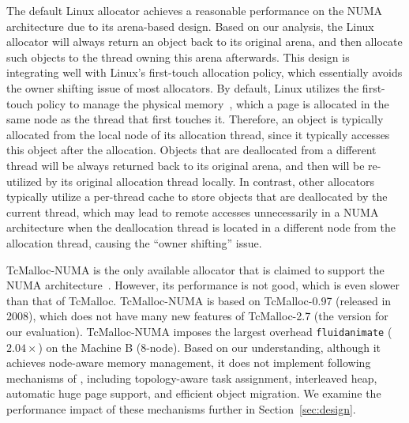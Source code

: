 The default Linux allocator achieves a reasonable performance on the NUMA architecture due to its arena-based design. Based on our analysis, the Linux allocator will always return an object back to its original arena, and then allocate such objects to the thread owning this arena afterwards. This design is integrating well with Linux's first-touch allocation policy, which essentially avoids the owner shifting issue of most allocators. By default, Linux utilizes the first-touch policy to manage the physical memory~\cite{Lameter:2013:NO:2508834.2513149}, which a page is allocated in the same node as the thread that first touches it. Therefore, an object is typically allocated from the local node of its allocation thread, since it typically accesses this object after the allocation. Objects that are deallocated from a different thread will be always returned back to its original arena, and then will be re-utilized by its original allocation thread locally. In contrast, other allocators typically utilize a per-thread cache to store objects that are deallocated by the current thread, which may lead to remote accesses unnecessarily in a NUMA architecture when the deallocation thread is located in a different node from the allocation thread, causing the ``owner shifting'' issue.  

 TcMalloc-NUMA is the only available allocator that is claimed to support the NUMA architecture~\cite{tcmallocnew}. However, its performance is not good, which is even slower than that of TcMalloc. TcMalloc-NUMA is based on TcMalloc-0.97 (released in 2008), which does not have many new features of TcMalloc-2.7 (the version for our evaluation). TcMalloc-NUMA imposes the largest overhead \texttt{fluidanimate} ($2.04\times$) on the Machine B (8-node).  Based on our understanding, although it achieves node-aware memory management, it does not implement following mechanisms of \NM{}, including topology-aware task assignment, interleaved heap, automatic huge page support, and efficient object migration. We examine the performance impact of these mechanisms further in Section~\ref{sec:design}.    
  


